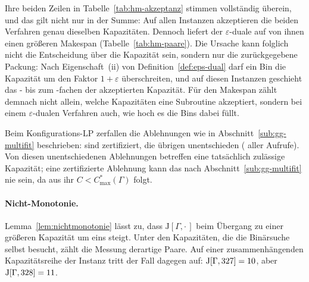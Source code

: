 Ihre beiden Zeilen in Tabelle~\ref{tab:hm-akzeptanz} stimmen vollständig überein, und das gilt
nicht nur in der Summe: Auf allen \HmEpsAkzeptanzInstanzen{} Instanzen akzeptieren die beiden
Verfahren genau dieselben Kapazitäten.
Dennoch liefert der $\varepsilon$-duale auf \HmEpsSchlechterRef{} von ihnen einen größeren
Makespan (Tabelle~\ref{tab:hm-paare}).
Die Ursache kann folglich nicht die Entscheidung über die Kapazität sein, sondern nur die
zurückgegebene Packung: Nach Eigenschaft~(ii) von Definition~\ref{def:eps-dual} darf ein Bin die
Kapazität um den Faktor $1+\varepsilon$ überschreiten, und auf diesen \HmEpsSchlechterRef{}
Instanzen geschieht das - bis zum \HmEpsUeberlastMax-fachen der akzeptierten Kapazität.
Für den Makespan zählt demnach nicht allein, welche Kapazitäten eine Subroutine akzeptiert,
sondern bei einem $\varepsilon$-dualen Verfahren auch, wie hoch es die Bins dabei füllt.

\begin{table}[htbp]
\centering
\small

\caption{Entscheidungen der Subroutinen über alle getesteten Kapazitäten. \emph{Zertifiziert}
  meint eine Ablehnung mit $\lceil \mathrm{LP} \rceil > m$, aus der nach
  Abschnitt~\ref{sub:gg-multifit} $C < C^{*}_{\max}(\Gamma)$ folgt. \emph{Zu Unrecht} zählt die
  Ablehnungen einer Kapazität, für die $\mathrm{OPT}[\Gamma,C] \le m$ gilt, für die es also eine
  gültige Packung in $m$ Bins gibt.}
\label{tab:hm-akzeptanz}
\end{table}

Beim Konfigurations-LP zerfallen die Ablehnungen wie in Abschnitt~\ref{sub:gg-multifit}
beschrieben: \HmGGZertifiziert{} sind zertifiziert, die übrigen \HmGGUnentschieden{}
unentschieden (\HmGGUnentschiedenAnteil{} aller Aufrufe).
Von diesen \HmGGUnentschieden{} unentschiedenen Ablehnungen betreffen \HmZuUnrechtGglp{} eine
tatsächlich zulässige Kapazität; eine zertifizierte Ablehnung kann das nach
Abschnitt~\ref{sub:gg-multifit} nie sein, da aus ihr $C < C^{*}_{\max}(\Gamma)$ folgt.

\paragraph{Nicht-Monotonie.}
Lemma~\ref{lem:nichtmonotonie} lässt zu, dass $\mathrm{J}[\Gamma,\cdot\,]$ beim Übergang zu einer
größeren Kapazität um eins steigt.
Unter den Kapazitäten, die die Binärsuche selbst besucht, zählt die Messung
\HmJansenNichtMonotonSpur{} derartige Paare.
Auf einer zusammenhängenden Kapazitätsreihe der Instanz \HmNichtMonotonInstanz{} tritt der Fall
dagegen auf: $\mathrm{J}[\Gamma, 327] = 10$, aber
$\mathrm{J}[\Gamma, 328] = 11$.

